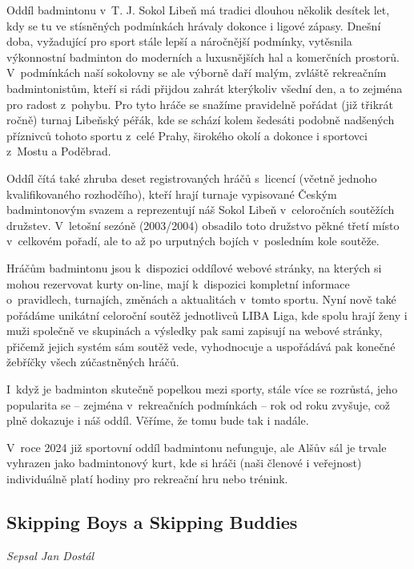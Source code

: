 \documentclass[a5paper, 11pt, twoside]{article}
\begin{document}
Oddíl badmintonu v~T. J. Sokol Libeň má tradici dlouhou několik desítek
let, kdy se tu ve stísněných podmínkách hrávaly dokonce i ligové zápasy.
Dnešní doba, vyžadující pro sport stále lepší a náročnější podmínky,
vytěsnila výkonnostní badminton do moderních a luxusnějších hal a
komerčních prostorů. V~podmínkách naší sokolovny se ale výborně daří
malým, zvláště rekreačním badmintonistům, kteří si rádi přijdou zahrát
kterýkoliv všední den, a to zejména pro radost z~pohybu. Pro tyto hráče
se snažíme pravidelně pořádat (již třikrát ročně) turnaj Libeňský péřák,
kde se schází kolem šedesáti podobně nadšených příznivců tohoto sportu
z~celé Prahy, širokého okolí a dokonce i sportovci z~Mostu a Poděbrad.

Oddíl čítá také zhruba deset registrovaných hráčů s~licencí (včetně
jednoho kvalifikovaného rozhodčího), kteří hrají turnaje vypisované
Českým badmintonovým svazem a reprezentují náš Sokol Libeň v~celoročních
soutěžích družstev. V~letošní sezóně (2003/2004) obsadilo toto družstvo
pěkné třetí místo v~celkovém pořadí, ale to až po urputných bojích
v~posledním kole soutěže.

Hráčům badmintonu jsou k~dispozici oddílové webové stránky, na kterých
si mohou rezervovat kurty on-line, mají k~dispozici kompletní informace
o~pravidlech, turnajích, změnách a aktualitách v~tomto sportu. Nyní nově
také pořádáme unikátní celoroční soutěž jednotlivců LIBA Liga, kde spolu
hrají ženy i muži společně ve skupinách a výsledky pak sami zapisují na
webové stránky, přičemž jejich systém sám soutěž vede, vyhodnocuje a
uspořádává pak konečné žebříčky všech zúčastněných hráčů.

I~když je badminton skutečně popelkou mezi sporty, stále více se
rozrůstá, jeho popularita se -- zejména v~rekreačních podmínkách -- rok
od roku zvyšuje, což plně dokazuje i náš oddíl. Věříme, že tomu bude tak
i nadále.

V~roce 2024 již sportovní oddíl badmintonu nefunguje, ale Alšův sál je
trvale vyhrazen jako badmintonový kurt, kde si hráči (naši členové i
veřejnost) individuálně platí hodiny pro rekreační hru nebo trénink.

\subsection{Skipping Boys a Skipping Buddies}

\begin{center}
  \textit{Sepsal Jan Dostál}
\end{center}
\end{document}
